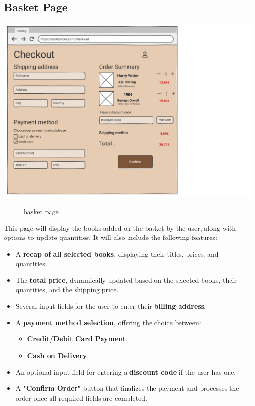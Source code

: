 \subsection{Basket Page} \label{sec:basket}

\includegraphics[width=0.6\linewidth]{HW1Report/photos/checkout2.png}

\begin{figure}[h!]
    \centering
    \caption{basket page}
    \label{fig:enter-label}
\end{figure}

This page will display the books added on the basket by the user, along with options to update quantities. It will also include the following features:

\begin{itemize}
    \item A \textbf{recap of all selected books}, displaying their titles, prices, and quantities.
    \item The \textbf{total price}, dynamically updated based on the selected books, their quantities, and the shipping price.
    \item Several input fields for the user to enter their \textbf{billing address}.
    \item A \textbf{payment method selection}, offering the choice between:
    \begin{itemize}
        \item \textbf{Credit/Debit Card Payment}.
        \item \textbf{Cash on Delivery}.
    \end{itemize}
    \item An optional input field for entering a \textbf{discount code} if the user has one.
    \item A \textbf{"Confirm Order"} button that finalizes the payment and processes the order once all required fields are completed.
\end{itemize}


